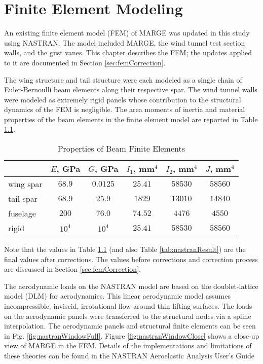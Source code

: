 \chapter{Finite Element Modeling}
\label{ch:nastran}

An existing finite element model (FEM) of MARGE was updated in this study using NASTRAN. The model included MARGE, the wind tunnel test section walls, and the gust vanes. This chapter describes the FEM; the updates applied to it are documented in Section \ref{sec:femCorrection}.

The wing structure and tail structure were each modeled as a single chain of Euler-Bernoulli beam elements along their respective spar. The wind tunnel walls were modeled as extremely rigid panels whose contribution to the structural dynamics of the FEM is negligible. The area moments of inertia and material properties of the beam elements in the finite element model are reported in Table \ref{tab:beamInertia}.
\begin{table}[H]
    \centering
    \caption{Properties of Beam Finite Elements}
    \label{tab:beamInertia}
    \begin{tabular}{lccccc}
        \hline\hline
                  & $E$, GPa & $G$, GPa & $I_1$, mm$^4$ & $I_2$, mm$^4$ & $J$, mm$^4$ \\
        \hline
        wing spar & $68.9$   & $0.0125$ & $25.41$       & $58530$       & $58560$     \\
        tail spar & $68.9$   & $25.9$   & $1829$        & $13010$       & $14840$     \\
        fuselage  & $200$    & $76.0$   & $74.52$       & $4476 $       & $4550 $     \\
        rigid     & $10^4$   & $10^4$   & $25.41$       & $58530$       & $58560$     \\
        \hline\hline
    \end{tabular}
\end{table}
Note that the values in Table \ref{tab:beamInertia} (and also Table \ref{tab:nastranResult}) are the final values after corrections. The values before corrections and correction process are discussed in Section \ref{sec:femCorrection}.

The aerodynamic loads on the NASTRAN model are based on the doublet-lattice model (DLM) for aerodynamics. This linear aerodynamic model assumes incompressible, inviscid, irrotational flow around thin lifting surfaces. The loads on the aerodynamic panels were transferred to the structural nodes via a spline interpolation. The aerodynamic panels and structural finite elements can be seen in Fig. \ref{fig:nastranWindowFull}. Figure \ref{fig:nastranWindowClose} shows a close-up view of MARGE in the FEM. Details of the implementations and limitations of these theories can be found in the NASTRAN Aeroelastic Analysis User's Guide \cite{Siemens2020}

